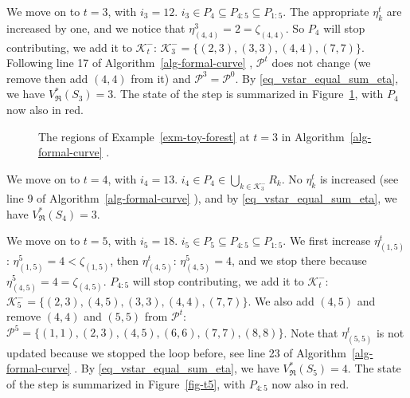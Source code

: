 \documentclass[
  11pt,
  a4paper,
]{article}
\theoremstyle{definition}
\theoremstyle{plain}
\theoremstyle{plain}
\theoremstyle{plain}
\theoremstyle{definition}
\theoremstyle{remark}
\begin{document}
We move on to \(t=3\), with \(i_3=12\).
\(i_3\in P_4\subseteq P_{4:5}\subseteq P_{1:5}\). The appropriate
\(\eta_k^t\) are increased by one, and we notice that
\(\eta_{(4, 4)}^3=2=\zeta_{(4, 4)}\). So \(P_4\) will stop contributing,
we add it to \(\mathcal{K}^-_t\):
\(\mathcal{K}^-_3=\{(2,3), (3,3), (4, 4), (7, 7)\}\). Following line 17
of  Algorithm~\ref{alg-formal-curve} , \(\mathcal{P}^t\) does not change
(we remove then add \((4,4)\) from it) and
\(\mathcal{P}^3=\mathcal{P}^0\). By \eqref{eq_vstar_equal_sum_eta}, we
have \(V^*_{\mathfrak{R}}(S_3)=3\). The state of the step is summarized
in Figure~\ref{fig-t3}, with \(P_4\) now also in red.

\begin{figure}


\caption{\label{fig-t3}The regions of Example~\ref{exm-toy-forest} at
\(t=3\) in  Algorithm~\ref{alg-formal-curve} .}

\end{figure}%

We move on to \(t=4\), with \(i_4=13\).
\(i_4\in P_4\in \bigcup_{k\in\mathcal{K}^-_3}R_k\). No \(\eta_k^t\) is
increased (see line 9 of  Algorithm~\ref{alg-formal-curve} ), and by
\eqref{eq_vstar_equal_sum_eta}, we have \(V^*_{\mathfrak{R}}(S_4)=3\).

We move on to \(t=5\), with \(i_5=18\).
\(i_5\in P_5\subseteq P_{4:5}\subseteq P_{1:5}\). We first increase
\(\eta_{(1,5)}^t\): \(\eta_{(1,5)}^5=4<\zeta_{(1,5)}\), then
\(\eta_{(4,5)}^t\): \(\eta_{(4,5)}^5=4\), and we stop there because
\(\eta_{(4,5)}^5=4=\zeta_{(4,5)}\). \(P_{4:5}\) will stop contributing,
we add it to \(\mathcal{K}^-_t\):
\(\mathcal{K}^-_5=\{(2,3), (4,5), (3,3), (4, 4), (7, 7)\}\). We also add
\((4,5)\) and remove \((4,4)\) and \((5,5)\) from \(\mathcal{P}^t\):
\(\mathcal{P}^5=\{(1,1), (2,3), (4,5), (6,6), (7,7), (8,8)\}\). Note
that \(\eta_{(5,5)}^t\) is not updated because we stopped the loop
before, see line 23 of  Algorithm~\ref{alg-formal-curve} . By
\eqref{eq_vstar_equal_sum_eta}, we have \(V^*_{\mathfrak{R}}(S_5)=4\).
The state of the step is summarized in Figure~\ref{fig-t5}, with
\(P_{4:5}\) now also in red.
\end{document}
